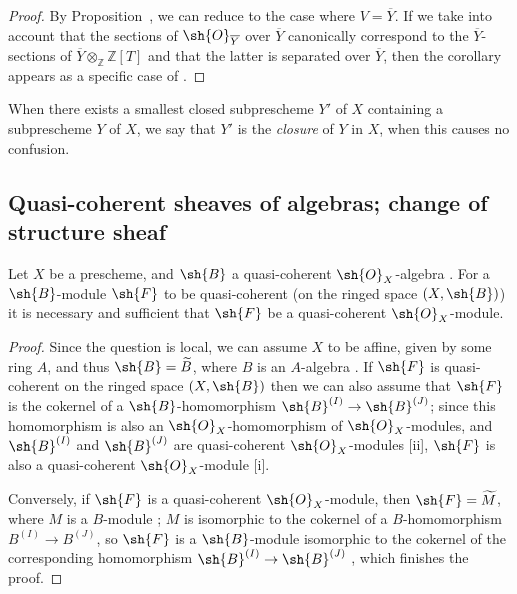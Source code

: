 \begin{proof}
By Proposition~, we can reduce to the case where $V=\overline{Y}$.
If we take into account that the sections of $\sh{O}_{\overline{Y}}$ over $\overline{Y}$ canonically correspond to the $\overline{Y}$-sections of $\overline{Y}\otimes_{\mathbb Z}\mathbb Z[T]$  and that the latter is separated over $\overline{Y}$, then the corollary appears as a specific case of .
\end{proof}

When there exists a smallest closed subprescheme $Y'$ of $X$ containing a subprescheme $Y$ of $X$, we say that $Y'$ is the \emph{closure} of $Y$ in $X$, when this causes no confusion.

\subsection{Quasi-coherent sheaves of algebras; change of structure sheaf}
\label{subsection:I.9.6}
\label{I.9.6}

\begin{proposition}[9.6.1]
\label{I.9.6.1}
Let $X$ be a prescheme, and $\sh{B}$ a quasi-coherent $\sh{O}_X$-algebra .
For a $\sh{B}$-module $\sh{F}$ to be quasi-coherent (on the ringed space $(X,\sh{B})$) it is necessary and sufficient that $\sh{F}$ be a quasi-coherent $\sh{O}_X$-module.
\end{proposition}

\begin{proof}
Since the question is local, we can assume $X$ to be affine, given by some ring $A$, and thus $\sh{B}=\widetilde{B}$, where $B$ is an $A$-algebra .
If $\sh{F}$ is quasi-coherent on the ringed space $(X,\sh{B})$ then we can also assume that $\sh{F}$ is the cokernel of a $\sh{B}$-homomorphism $\sh{B}^{(I)}\to\sh{B}^{(J)}$; since this homomorphism is also an $\sh{O}_X$-homomorphism of $\sh{O}_X$-modules, and $\sh{B}^{(I)}$ and $\sh{B}^{(J)}$ are quasi-coherent $\sh{O}_X$-modules [ii], $\sh{F}$ is also a quasi-coherent $\sh{O}_X$-module [i].

Conversely, if $\sh{F}$ is a quasi-coherent $\sh{O}_X$-module, then $\sh{F}=\widetilde{M}$, where $M$ is a $B$-module ; $M$ is isomorphic to the cokernel of a $B$-homomorphism $B^{(I)}\to B^{(J)}$, so $\sh{F}$ is a $\sh{B}$-module isomorphic to the cokernel of the corresponding homomorphism $\sh{B}^{(I)}\to\sh{B}^{(J)}$ , which finishes the proof.
\end{proof}

